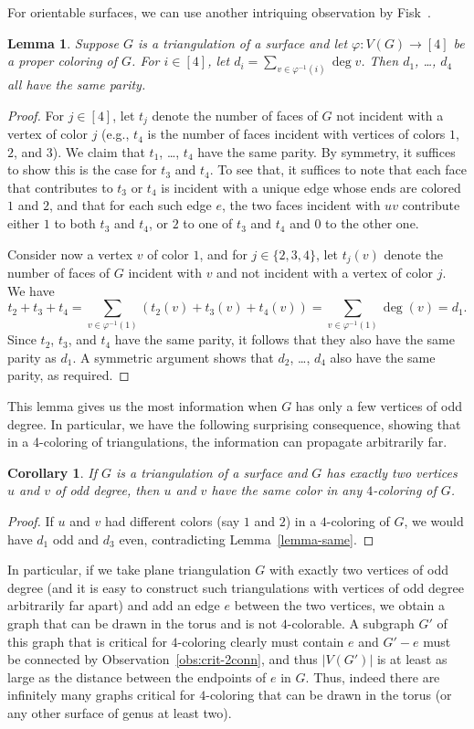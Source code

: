\documentclass[12pt,twoside,openright,a4paper]{book}
\newtheorem{lemma}[theorem]{Lemma}
\newtheorem{corollary}[theorem]{Corollary}
\begin{document}
For orientable surfaces, we can use another intriquing observation by Fisk~\cite{Fisk78}.

\begin{lemma}\label{lemma:oddsame}
Suppose $G$ is a triangulation of a surface and let $\varphi:V(G)\to[4]$ be a proper coloring of $G$.
For $i\in[4]$, let $d_i=\sum_{v\in \varphi^{-1}(i)} \deg v$.  Then $d_1$, \ldots, $d_4$ all have the same parity.
\end{lemma}
\begin{proof}
For $j\in[4]$, let $t_j$ denote the number of faces of $G$ not incident with a vertex of color $j$ (e.g., $t_4$
is the number of faces incident with vertices of colors $1$, $2$, and $3$).
We claim that $t_1$, \ldots, $t_4$ have the same parity.  By symmetry, it suffices to show this is the case for $t_3$ and $t_4$.
To see that, it suffices to note that each face that contributes to $t_3$ or $t_4$ is incident with a unique edge
whose ends are colored $1$ and $2$, and that for each such edge $e$, the two faces incident with $uv$ contribute either
$1$ to both $t_3$ and $t_4$, or $2$ to one of $t_3$ and $t_4$ and $0$ to the other one.

Consider now a vertex $v$ of color $1$, and for $j\in \{2,3,4\}$, let $t_j(v)$ denote the number of faces of
$G$ incident with $v$ and not incident with a vertex of color $j$.  We have
$$t_2+t_3+t_4=\sum_{v\in \varphi^{-1}(1)} (t_2(v)+t_3(v)+t_4(v))=\sum_{v\in \varphi^{-1}(1)} \deg(v)=d_1.$$
Since $t_2$, $t_3$, and $t_4$ have the same parity, it follows that they also have the same parity as $d_1$.
A symmetric argument shows that $d_2$, \ldots, $d_4$ also have the same parity, as required.
\end{proof}
This lemma gives us the most information when $G$ has only a few vertices of odd degree.
In particular, we have the following surprising consequence, showing that in a 4-coloring of triangulations,
the information can propagate arbitrarily far.

\begin{corollary}
If $G$ is a triangulation of a surface and $G$ has exactly two vertices $u$ and $v$ of odd degree,
then $u$ and $v$ have the same color in any $4$-coloring of $G$.
\end{corollary}
\begin{proof}
If $u$ and $v$ had different colors (say $1$ and $2$) in a $4$-coloring of $G$, we would have $d_1$ odd
and $d_3$ even, contradicting Lemma~\ref{lemma-same}.
\end{proof}
In particular, if we take plane triangulation $G$ with exactly two vertices of odd degree (and it is easy to
construct such triangulations with vertices of odd degree arbitrarily far apart) and add an edge $e$ between
the two vertices, we obtain a graph that can be drawn in the torus and is not $4$-colorable.
A subgraph $G'$ of this graph that is critical for $4$-coloring clearly must contain $e$ and $G'-e$ must be connected
by Observation~\ref{obs:crit-2conn}, and thus $|V(G')|$ is at least as large as the distance between the endpoints
of $e$ in $G$.  Thus, indeed there are infinitely many graphs critical for $4$-coloring that can be drawn
in the torus (or any other surface of genus at least two).
\end{document}
